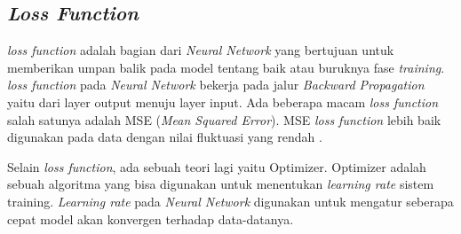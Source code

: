 \subsection{\emph{Loss Function}}
\emph{loss function} adalah bagian dari \emph{Neural Network} 
yang bertujuan untuk memberikan umpan balik 
pada model tentang baik atau buruknya fase \emph{training}. 
\emph{loss function} pada \emph{Neural Network} bekerja pada jalur 
\emph{Backward Propagation} yaitu dari layer output menuju layer input. 
Ada beberapa macam \emph{loss function} salah satunya adalah MSE 
(\emph{Mean Squared Error}). MSE \emph{loss function} lebih baik digunakan pada 
data dengan nilai fluktuasi yang rendah \Parencite{ref_loss_function}. 

Selain \emph{loss function}, ada sebuah teori lagi yaitu Optimizer. 
Optimizer adalah sebuah algoritma yang bisa digunakan untuk menentukan 
\emph{learning rate} sistem training. \emph{Learning rate} pada 
\emph{Neural Network} digunakan untuk mengatur seberapa cepat model 
akan konvergen terhadap data-datanya. 

